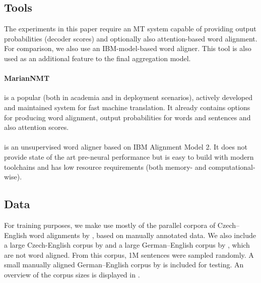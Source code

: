 \subsection{Tools}

The experiments in this paper require an MT system capable of providing output probabilities (decoder scores) and optionally also attention-based word alignment. For comparison, we also use an IBM-model-based word aligner. This tool is also used as an additional feature to the final aggregation model.

\paragraph{MarianNMT}\hspace{-0.25cm} \citep{junczys2018marian, junczys2018marian2} is a popular (both in academia and in deployment scenarios), actively developed and maintained system for fast machine translation. It already contains options for producing word alignment, output probabilities for words and sentences and also attention scores.

\paragraph{\fastalign}\hspace{-0.25cm} \citep{dyer2013simple} is an unsupervised word aligner based on IBM Alignment Model 2. It does not provide state of the art pre-neural performance but is easy to build with modern toolchains and has low resource requirements (both memory- and computational-wise).

\subsection{Data}

For training purposes, we make use mostly of the parallel corpora of Czech--English word alignments by \citet{marecek_csen_algn_corpus}, based on manually annotated data. We also include a large Czech-English corpus by \citet{czeng2} and a large German--English corpus by \citet{rozis_tilde}, which are not word aligned. From this corpus, 1M sentences were sampled randomly. A small manually aligned German--English corpus by \citet{bicini_ende_algn_corpus} is included for testing. An overview of the corpus sizes is displayed in .

